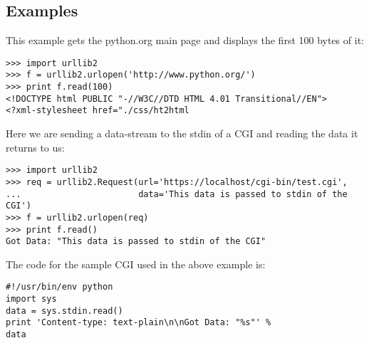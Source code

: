 \subsection{Examples \label{urllib2-examples}}

This example gets the python.org main page and displays the first 100
bytes of it:

\begin{verbatim}
>>> import urllib2
>>> f = urllib2.urlopen('http://www.python.org/')
>>> print f.read(100)
<!DOCTYPE html PUBLIC "-//W3C//DTD HTML 4.01 Transitional//EN">
<?xml-stylesheet href="./css/ht2html
\end{verbatim}

Here we are sending a data-stream to the stdin of a CGI and reading
the data it returns to us:

\begin{verbatim}
>>> import urllib2
>>> req = urllib2.Request(url='https://localhost/cgi-bin/test.cgi',
...                       data='This data is passed to stdin of the CGI')
>>> f = urllib2.urlopen(req)
>>> print f.read()
Got Data: "This data is passed to stdin of the CGI"
\end{verbatim}

The code for the sample CGI used in the above example is:

\begin{verbatim}
#!/usr/bin/env python
import sys
data = sys.stdin.read()
print 'Content-type: text-plain\n\nGot Data: "%s"' %
data
\end{verbatim}
